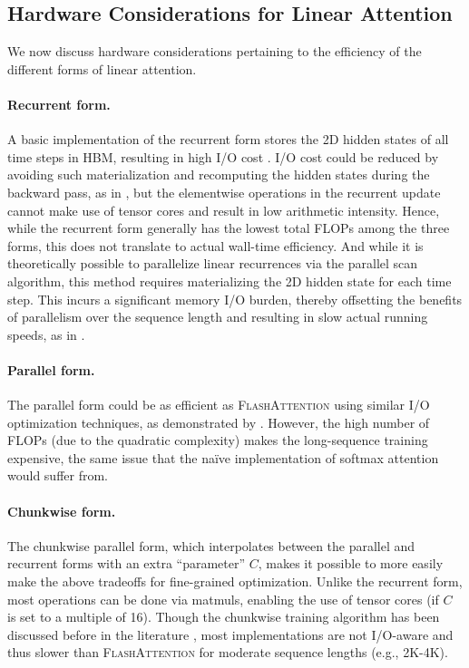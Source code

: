 \subsection{Hardware Considerations for Linear Attention}

We now discuss hardware considerations pertaining to the efficiency of the different forms of linear attention.  

\paragraph{Recurrent form.}  A basic implementation of the recurrent form  stores the 2D hidden states of all time steps in HBM, resulting in  high I/O cost \cite{mao-2022-fine}. I/O cost could be reduced by avoiding such materialization and recomputing the hidden states during the backward pass, as in \citet{katharopoulos2020transformers}, but the elementwise operations in the recurrent update cannot make use of tensor cores and result in low arithmetic intensity. Hence, while the recurrent form generally has the lowest total FLOPs among the three forms, this does not translate to actual wall-time efficiency.  And while it is theoretically possible to parallelize  linear recurrences via the parallel scan algorithm, this method requires materializing the 2D hidden state for each time step. This  incurs a significant memory I/O burden, thereby offsetting the benefits of parallelism over the sequence length and resulting in slow actual running speeds, as in 
 \citet{gatedloop}. 

\paragraph{Parallel form.} The parallel form could be as efficient as \textsc{FlashAttention} using similar I/O optimization techniques, as demonstrated by \citet{qin2023scaling}. However, the high number of FLOPs (due to the quadratic complexity) makes the long-sequence training expensive, the same issue that the na\"ive implementation of softmax attention would suffer from. 

\paragraph{Chunkwise form.} The chunkwise parallel form, which interpolates between the parallel and recurrent forms with an extra ``parameter'' $C$, makes it possible to more easily make the above tradeoffs for fine-grained  optimization. Unlike the recurrent form, most operations can be done via matmuls, enabling the use of tensor cores (if $C$ is set to a multiple of 16). Though the chunkwise training algorithm has been discussed before in the literature \cite{GAU, sun2023retentive}, most implementations are not I/O-aware and thus slower than \textsc{FlashAttention} for moderate sequence lengths (e.g., 2K-4K). 

